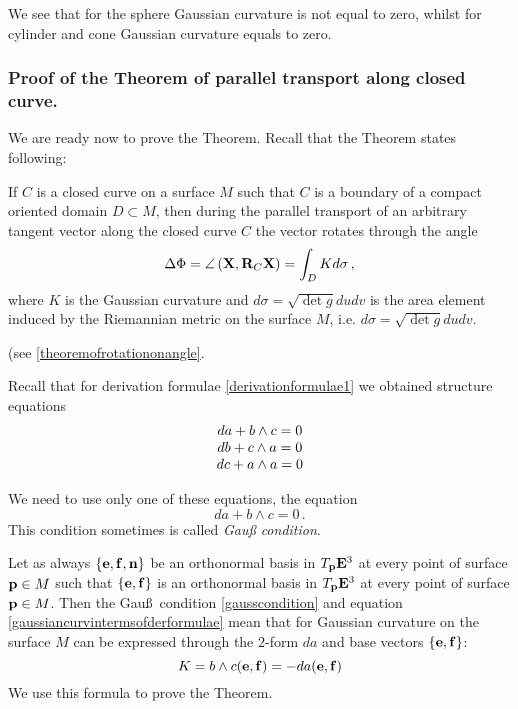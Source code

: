 \documentclass[12pt]{article}
\theoremstyle{theorem}
\numberwithin{equation}{section}
\begin{document}
{We see that for the sphere  Gaussian curvature is not equal to zero, whilst for cylinder and cone Gaussian curvature
equals to zero.


\subsubsection { Proof of the Theorem of parallel transport along closed curve.}

We are ready now to prove the Theorem.  Recall that the Theorem states following:

If $C$ is a closed curve on a surface $M$ such that $C$ is a boundary of a compact oriented domain $D\subset M$,
then during the  parallel transport of an arbitrary tangent vector  along the closed curve $C$
the vector rotates through the angle
\begin{equation}\label{theoremofrotationonangle4}
\Delta\Phi=\angle\left({{\bf X}, {\bf R}_C{\bf X}}\right)=\int_D K d\sigma\,,
             \end{equation}
where $K$ is the Gaussian curvature and $d\sigma=\sqrt {\det g}dudv$ is the area element induced by the
Riemannian metric on the surface $M$, i.e.  $d\sigma=\sqrt {\det g}dudv$.

(see \eqref{theoremofrotationonangle}.


Recall that for derivation formulae
\eqref{derivationformulae1} we obtained structure equations
                  \begin{equation}\label{firststructureformula4}
               \begin{matrix}
                da+b\wedge c=0\cr
                 db+c\wedge a=0\cr
                 dc+a\wedge a=0\cr
                 \end{matrix}
               \end{equation}

We need to use only one of these equations, the equation
             \begin{equation}\label{gausscondition}
                da+b\wedge c=0\,.
             \end{equation}
This condition sometimes is called {\it Gau\ss \,\,condition}.



Let as always  $\{{\bf e},{\bf f},{\bf n}\}$ be an orthonormal basis in $T_{{\bf p}}{\bf E}^3$ at every point of surface  ${\bf p}\in M$
such that $\{{\bf e},{\bf f}\}$ is an orthonormal basis in $T_{{\bf p}}{\bf E}^3$ at every point of surface  ${\bf p}\in M$.
Then the  Gau\ss\, condition \eqref{gausscondition} and equation \eqref{gaussiancurvintermsofderformulae} mean
 that  for Gaussian curvature on the surface $M$ can be expressed through the $2$-form $da$ and base vectors $\{{\bf e},{\bf f}\}$:
              \begin{equation}\label{gaussiancurvatureintermsof form a}
                K=b\wedge c({\bf e},{\bf f})=-da({\bf e},{\bf f})
              \end{equation}
  We use this formula to prove the Theorem.



}
\end{document}
